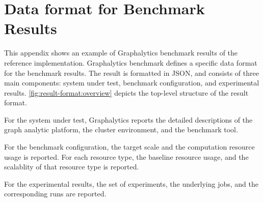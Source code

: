\chapter{Data format for Benchmark Results}
\label{chap:data-format}

This appendix shows an example of Graphalytics benchmark results of the reference implementation. Graphalytics benchmark defines a specific data format for the benchmark results. The result is formatted in JSON, and consists of three main components: system under test, benchmark configuration, and experimental results. \autoref{fig:result-format:overview} depicts the top-level structure of the result format.



For the system under test, Graphalytics reports the detailed descriptions of the graph analytic platform, the cluster environment, and the benchmark tool.



For the benchmark configuration, the target scale and the computation resource usage is reported. For each resource type, the baseline resource usage, and the scalablity of that resource type is reported.





For the experimental results, the set of experiments, the underlying jobs, and the corresponding runs are reported.
